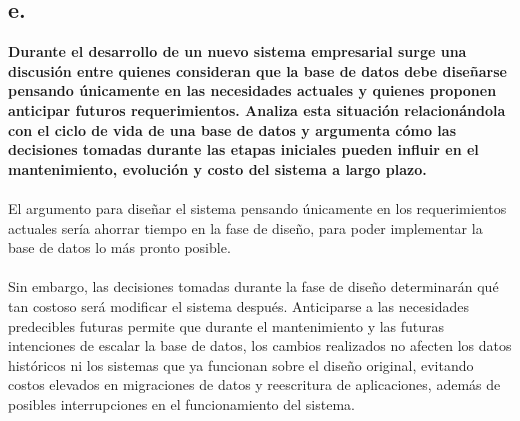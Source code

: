 
\subsection*{e.}

\textbf{Durante el desarrollo de un nuevo sistema empresarial surge una discusión entre quienes consideran que la base de datos debe diseñarse pensando únicamente en las necesidades actuales y quienes proponen anticipar futuros requerimientos. Analiza esta situación relacionándola con el ciclo de vida de una base de datos y argumenta cómo las decisiones tomadas durante las etapas iniciales pueden influir en el mantenimiento, evolución y costo del sistema a largo plazo.}\\ \\
El argumento para diseñar el sistema pensando únicamente en los requerimientos actuales sería ahorrar tiempo en la fase de diseño, para poder implementar la base de datos lo más pronto posible.\\ \\
Sin embargo, las decisiones tomadas durante la fase de diseño determinarán qué tan costoso será modificar el sistema después. Anticiparse a las necesidades predecibles futuras permite que durante el mantenimiento y las futuras intenciones de escalar la base de datos, los cambios realizados no afecten los datos históricos ni los sistemas que ya funcionan sobre el diseño original, evitando costos elevados en migraciones de datos y reescritura de aplicaciones, además de posibles interrupciones en el funcionamiento del sistema.